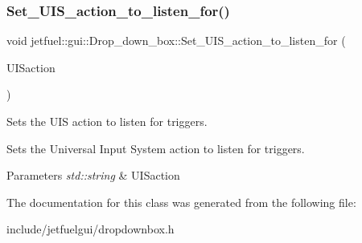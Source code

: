 \subsubsection{\texorpdfstring{Set\+\_\+\+U\+I\+S\+\_\+action\+\_\+to\+\_\+listen\+\_\+for()}{Set\_UIS\_action\_to\_listen\_for()}}
{\footnotesize\ttfamily void jetfuel\+::gui\+::\+Drop\+\_\+down\+\_\+box\+::\+Set\+\_\+\+U\+I\+S\+\_\+action\+\_\+to\+\_\+listen\+\_\+for (\begin{DoxyParamCaption}\item[{const std\+::string}]{U\+I\+Saction }\end{DoxyParamCaption})\hspace{0.3cm}{\ttfamily [inline]}}



Sets the U\+IS action to listen for triggers. 

Sets the Universal Input System action to listen for triggers.


\begin{DoxyParams}{Parameters}
{\em std\+::string} & U\+I\+Saction \\
\hline
\end{DoxyParams}


The documentation for this class was generated from the following file\+:\begin{DoxyCompactItemize}
\item 
include/jetfuelgui/dropdownbox.\+h\end{DoxyCompactItemize}
